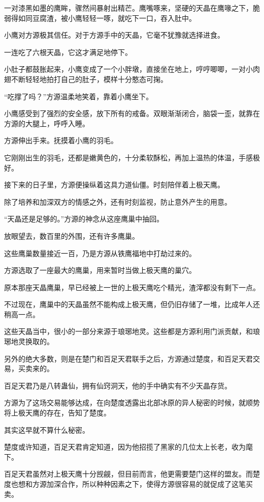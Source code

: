 \begin{this_body}
一对漆黑如墨的鹰眸，骤然间暴射出精芒。鹰嘴啄来，坚硬的天晶在鹰喙之下，脆弱得如同豆腐渣，被小鹰轻轻一啄，就吃下一口，吞入肚中。

小鹰对方源极其信任。对于方源手中的天晶，它毫不犹豫就选择进食。

一连吃了六根天晶，它这才满足地停下。

小肚子都鼓胀起来，小鹰变成了一个小胖墩，直接坐在地上，哼哼唧唧，一对小肉翅不断轻轻地拍打自己的肚子，模样十分憨态可掬。

“吃撑了吗？”方源温柔地笑着，靠着小鹰坐下。

小鹰感受到了强烈的安全感，放下所有的戒备。双眼渐渐闭合，脑袋一歪，就靠在方源的大腿上，呼呼入睡。

方源伸出手来。抚摸着小鹰的羽毛。

它刚刚出生的羽毛，还都是嫩黄色的，十分柔软酥松，再加上温热的体温，手感极好。

接下来的日子里，方源便操纵着这具力道仙僵。时刻陪伴着上极天鹰。

除了培养和加深双方的情感之外，还有时刻监视，防止意外产生的用意。

“天晶还是足够的。”方源的神念从这座鹰巢中抽回。

放眼望去，数百里的外围，还有许多鹰巢。

这些鹰巢数量接近一百，乃是方源从铁鹰福地中打劫过来的。

方源选取了一座最大的鹰巢，用来暂时当做上极天鹰的巢穴。

原本那座天晶鹰巢，早已经被上一世的上极天鹰吃个精光，渣滓都没有剩下一点。

不过现在，鹰巢中的天晶虽然不能构成上极天鹰，但仍旧存储了一堆，比成年人还稍高一点。

这些天晶当中，很小的一部分来源于琅琊地灵。这些都是方源利用门派贡献，和琅琊地灵换取的。

另外的绝大多数，则是在楚门和百足天君联手之后，方源通过楚度，和百足天君交易，买卖来的。

百足天君乃是八转蛊仙，拥有仙窍洞天，他的手中确实有不少天晶存货。

方源为了这场交易能够达成，在向楚度透露出北部冰原的异人秘密的时候，就顺势将上极天鹰的存在，告知了楚度。

其实这早就不算什么秘密。

楚度或许知道，百足天君肯定知道，因为他招揽了黑家的几位太上长老，收为麾下。

百足天君虽然对上极天鹰十分觊觎，但目前而言，他更需要楚门这样的盟友。而楚度也想和方源加深合作，所以种种因素之下，使得方源很容易的就促成了这笔买卖。


\end{this_body}
